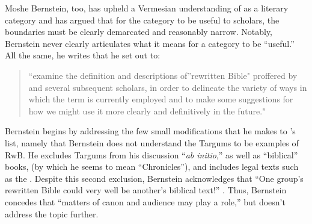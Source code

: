  Moshe Bernstein, too, has upheld a Vermesian understanding of \rwb as a literary category and has argued that for the category to be useful to scholars, the boundaries must be clearly demarcated and reasonably narrow.\autocite{bernstein_textus2005} Notably, Bernstein never clearly articulates what it means for a category to be ``useful.'' All the same, he writes that he set out to: 

 \begin{quote} ``examine the definition and descriptions of''rewritten Bible" proffered by \vermes and several subsequent scholars, in order to delineate the variety of ways in which the term is currently employed and to make some suggestions for how we might use it more clearly and definitively in the future." \autocite[171--172]{bernstein_textus2005} \end{quote} 

 Bernstein begins by addressing the few small modifications that he makes to \vermes's list, namely that Bernstein does not understand the Targums to be examples of RwB. He excludes Targums from his discussion ``\emph{ab initio},'' as well as ``biblical'' books, (by which he seems to mean ``Chronicles''), and includes legal texts such as the \templescroll. Despite this second exclusion, Bernstein acknowledges that ``One group's rewritten Bible could very well be another's biblical text!'' \autocite[175. This seems particularly odd, since, and Ethiopian Christian may protest that \jub should be excluded as well.]{bernstein_textus2005}. Thus, Bernstein concedes that ``matters of canon and audience may play a role,'' but doesn't address the topic further. 

